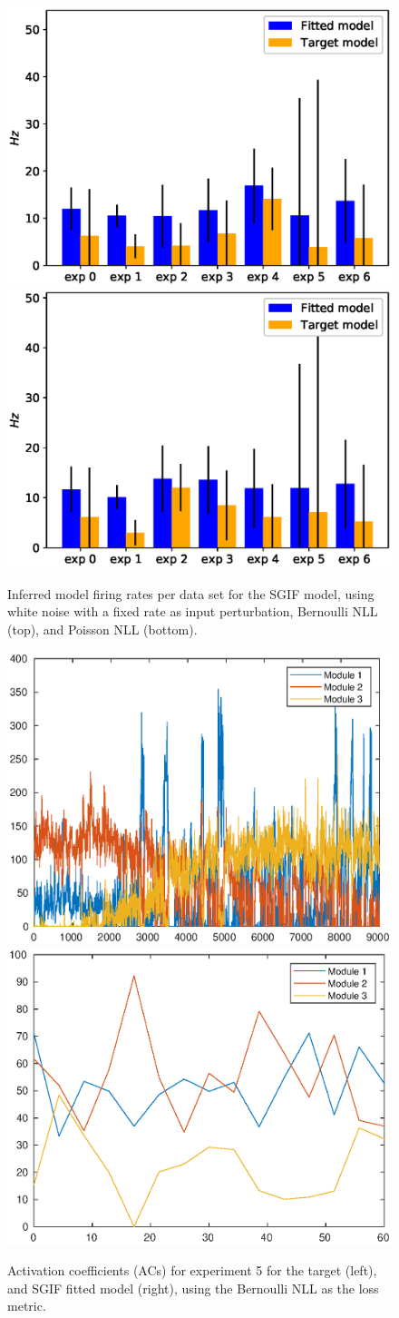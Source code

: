 \documentclass[mphil,deptreport,ianc]{infthesis} %
\begin{document}
\begin{figure}
    \centering
    \includegraphics[width=0.49\columnwidth]{figures/sleep/approx_rate_across_exp_microGIF_bernoulli_nll_vs_fitted.eps}
    \includegraphics[width=0.49\columnwidth]{figures/sleep/approx_rate_across_exp_microGIF_poisson_nll_vs_fitted.eps}
    \caption{Inferred model firing rates per data set for the SGIF model, using white noise with a fixed rate as input perturbation, Bernoulli NLL (top), and Poisson NLL (bottom).}
    \label{fig:approx_rates_sleep_exps_SGIF}
\end{figure}


\begin{figure}
    \centering
    \includegraphics[width=0.49\columnwidth]{figures/sleep/ACs138.eps}
    \includegraphics[width=0.49\columnwidth]{figures/sleep/ACs_SGIF_exp5_fit_bernoulli_nll_2.eps}
    \caption{Activation coefficients (ACs) for experiment 5 for the target (left), and SGIF fitted model (right), using the Bernoulli NLL as the loss metric.}
    \label{fig:ACs_exp5}
\end{figure}
\end{document}
